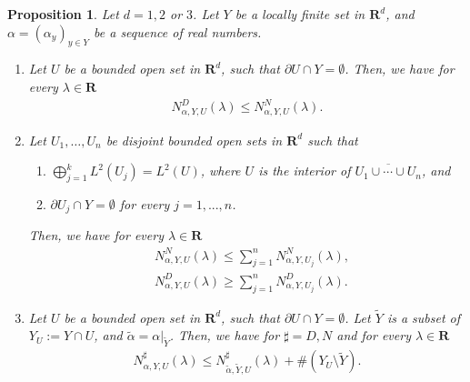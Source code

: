 \documentclass[12pt,a4paper]{article}
\newtheorem{proposition}[theorem]{Proposition}
\begin{document}
\begin{proposition}
 \label{proposition_DNbracketing}
Let $d=1,2$ or $3$.
Let $Y$ be a locally finite set in $\mathbf{R}^d$,
and $\alpha=(\alpha_y)_{y\in Y}$ be a sequence of real numbers.
\begin{enumerate}
 \item [(1)]
Let $U$ be a bounded open set in $\mathbf{R}^d$,
such that $\partial U\cap Y=\emptyset$.
Then, we have for every $\lambda\in \mathbf{R}$
\begin{align*}
N^D_{\alpha,Y,U}(\lambda)
\leq 
N^N_{\alpha,Y,U}(\lambda).
\end{align*}

 \item[(2)]
Let $U_1, \ldots, U_n$ be disjoint bounded open sets in $\mathbf{R}^d$
such that
\begin{enumerate}
 \item[(i)]
$\bigoplus_{j=1}^k L^2(U_j)=L^2(U)$,
where $U$ is the interior of $\overline{U_1\cup\cdots \cup U_n}$, and
 \item[(ii)]  $\partial U_j\cap Y=\emptyset$ for every $j=1,...,n$.
\end{enumerate}
Then, we have for every $\lambda\in \mathbf{R}$
\begin{align}
& N^N_{\alpha,Y,U}(\lambda)
\leq
\sum_{j=1}^n 
 N^N_{\alpha,Y,U_j}(\lambda),
\label{06_43}
\\
& N^D_{\alpha,Y,U}(\lambda)
\geq
\sum_{j=1}^n 
 N^D_{\alpha,Y,U_j}(\lambda).
\label{06_44}
\end{align}



 \item[(3)] Let $U$ be a bounded open set in $\mathbf{R}^d$,
such that $\partial U\cap Y=\emptyset$.
Let $\widetilde{Y}$ is a subset of $Y_U:=Y\cap U$,
and $\widetilde{\alpha}=\alpha|_{\widetilde{Y}}$.
Then, we have for $\sharp=D,N$ and for every $\lambda\in \mathbf{R}$
\begin{align}
\label{06_45}
 N^\sharp_{\alpha,Y,U}(\lambda)
\leq
 N^\sharp_{\widetilde{\alpha},\widetilde{Y},U}(\lambda)+\#(Y_U\setminus \widetilde{Y}).
\end{align}
\end{enumerate}
\end{proposition}
\end{document}
